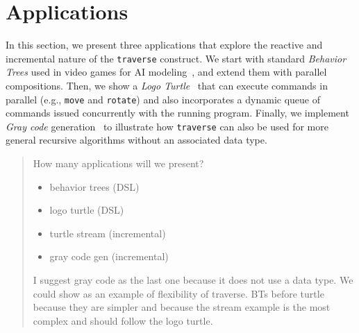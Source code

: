 \documentclass{acm_proc_article-sp}
\newcommand{\code}[1] {{\small{\texttt{#1}}}}
\begin{document}
\begin{comment}
\begin{figure}%
\begin{lstlisting}[numbers=left,xleftmargin=3em]
class FoldL with
   pool List[]&   l;
   pool Action[]& actions;
   var  int&     acc;
do
   traverse e in l do
      if e:CONS then
         var Action*? a =
            spawn Action(e, acc);
         await *a;
      end
   end
end
\end{lstlisting}
\caption{
Calculating the \emph{sum} of a list.
\label{lst.sum}
}
\end{figure}
\end{comment}

\section{Applications}

In this section, we present three applications that explore the reactive and 
incremental nature of the \code{traverse} construct.
We start with standard \emph{Behavior Trees} used in video games for AI 
modeling~\cite{TODO}, and extend them with parallel compositions.
Then, we show a \emph{Logo Turtle}~\cite{TODO} that can execute commands in 
parallel (e.g., \code{move} and \code{rotate}) and also incorporates a dynamic 
queue of commands issued concurrently with the running program.
Finally, we implement \emph{Gray code} generation~\cite{TODO} to illustrate how 
\code{traverse} can also be used for more general recursive algorithms without 
an associated data type.

\begin{quotation}
How many applications will we present?

\begin{itemize}
    \item behavior trees (DSL)
    \item logo turtle (DSL)
    \item turtle stream (incremental)
    \item gray code gen (incremental)
\end{itemize}

I suggest gray code as the last one because it does not use a data type.
We could show as an example of flexibility of traverse.
BTs before turtle because they are simpler and because the stream example is 
the most complex and should follow the logo turtle.
\end{quotation}
\end{document}
